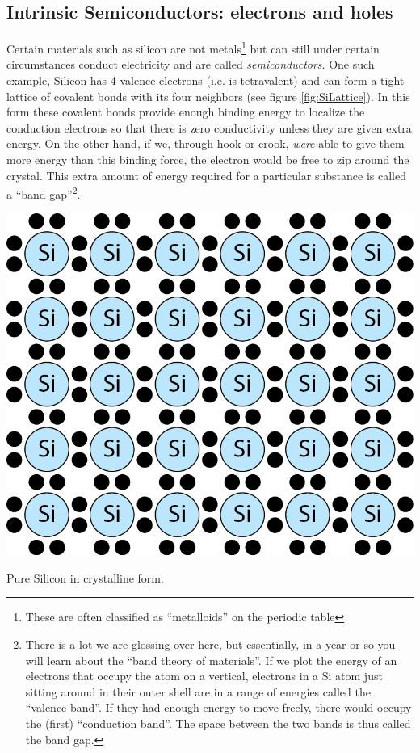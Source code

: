 \documentclass{tufte-book}
\begin{document}
\subsection{Intrinsic Semiconductors: electrons and holes}
Certain materials such as silicon are not metals\footnote{These are often classified as ``metalloids'' on the periodic table} but can still under certain circumstances conduct electricity and are called \textit{semiconductors}. One such example, Silicon has 4 valence electrons (i.e. is tetravalent) and can form a tight lattice of covalent bonds with its four neighbors (see figure \ref{fig:SiLattice}). In this form these covalent bonds provide enough binding energy to localize the conduction electrons so that there is zero conductivity unless they are given extra energy. On the other hand, if we, through hook or crook, \textit{were} able to give them more energy than this binding force, the electron would be free to zip around the crystal. This extra amount of energy required for a particular substance is called a ``band gap''\footnote{There is a lot we are glossing over here, but essentially, in a year or so you will learn about the ``band theory of materials''. If we plot the energy of an electrons that occupy the atom on a vertical, electrons in a Si atom just sitting around in their outer shell are in a range of energies called the ``valence band''. If they had enough energy to move freely, there would occupy the (first) ``conduction band''. The space between the two bands is thus called the band gap.}. 

\begin{marginfigure}%
  \includegraphics[]{SiLattice}
  \caption{Pure Silicon in crystalline form.}
  \label{fig:SiLattice}
\end{marginfigure}
\end{document}
